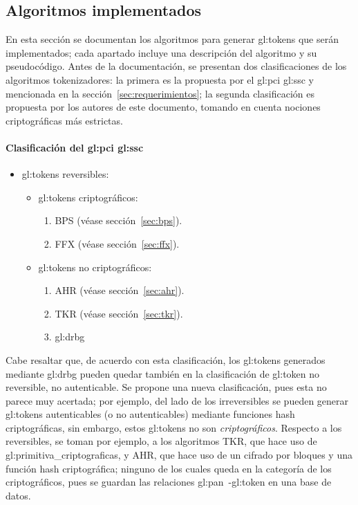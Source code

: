 %
%

\subsection{Algoritmos implementados}
\label{sec:algoritmos}

En esta sección se documentan los algoritmos para generar \glspl{gl:token}
que serán implementados; cada apartado incluye una descripción del
algoritmo y su pseudocódigo. Antes de la documentación, se presentan
dos clasificaciones de los algoritmos tokenizadores: la primera es la propuesta
por el \gls{gl:pci} \gls{gl:ssc} y mencionada en la
sección~\ref{sec:requerimientos}; la segunda clasificación es propuesta por los
autores de este documento, tomando en cuenta nociones criptográficas más
estrictas.

\paragraph{Clasificación del \acrshort{gl:pci} \acrshort{gl:ssc}}
\begin{itemize}
  \item \Glspl{gl:token} reversibles:
    \begin{itemize}
      \item \Glspl{gl:token} criptográficos:
        \begin{enumerate}
          \item BPS (véase sección~\ref{sec:bps}).
          \item FFX (véase sección~\ref{sec:ffx}).
        \end{enumerate}
      \item \Glspl{gl:token} no criptográficos:
        \begin{enumerate}
          \item AHR (véase sección~\ref{sec:ahr}).
          \item TKR (véase sección~\ref{sec:tkr}).
          \item \gls{gl:drbg}
        \end{enumerate}
    \end{itemize}
\end{itemize}

Cabe resaltar que, de acuerdo con esta clasificación, los \glspl{gl:token}
generados mediante \gls{gl:drbg} pueden quedar también en la clasificación
de \gls{gl:token} no reversible, no autenticable. Se propone una nueva
clasificación, pues esta no parece muy acertada; por ejemplo, del lado de los
irreversibles se pueden generar \glspl{gl:token} autenticables (o no
autenticables) mediante funciones hash criptográficas, sin embargo, estos
\glspl{gl:token} no son \textit{criptográficos}. Respecto a los reversibles,
se toman por ejemplo, a los algoritmos TKR, que hace uso de
\glspl{gl:primitiva_criptografica}, y AHR, que hace uso de un cifrado
por bloques y una función hash criptográfica; ninguno de los cuales queda en
la categoría de los criptográficos, pues se guardan las relaciones
\gls{gl:pan}~-\gls{gl:token} en una base de datos.

